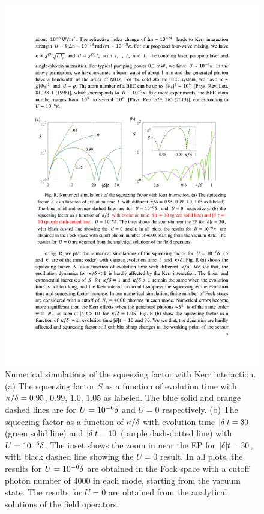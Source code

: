 \documentclass[twocolumn,prl,floatfix,citeautoscript,nofootinbib,superscriptaddress]{revtex4}
\begin{document}
\begin{widetext}
\begin{figure}[t]
\includegraphics[width=0.8\linewidth]{FigKerr.pdf}
\caption{Numerical simulations of the squeezing factor with Kerr
interaction. (a) The squeezing factor $S$ as a function of evolution time
with $\protect\kappa/\protect\delta=0.95$, $0.99$, $1.0$, $1.05$ as labeled.
The blue solid and orange dashed lines are for $U=10^{-6}\protect\delta$ and
$U=0$ respectively. (b) The squeezing factor as a function of $\protect\kappa%
/\protect\delta$ with evolution time $|\protect\delta|t=30$ (green solid
line) and $|\protect\delta|t=10$ (purple dash-dotted line) with $U=10^{-6}%
\protect\delta$. The inset shows the zoom in near the EP for $|\protect\delta%
|t=30$, with black dashed line showing the $U=0$ result. In all plots, the
results for $U=10^{-6}\protect\delta$ are obtained in the Fock space with a
cutoff photon number of 4000 in each mode, starting from the vacuum state.
The results for $U=0$ are obtained from the analytical solutions of the
field operators.}
\label{fig:Kerr}
\end{figure}


\end{widetext}
\end{document}
